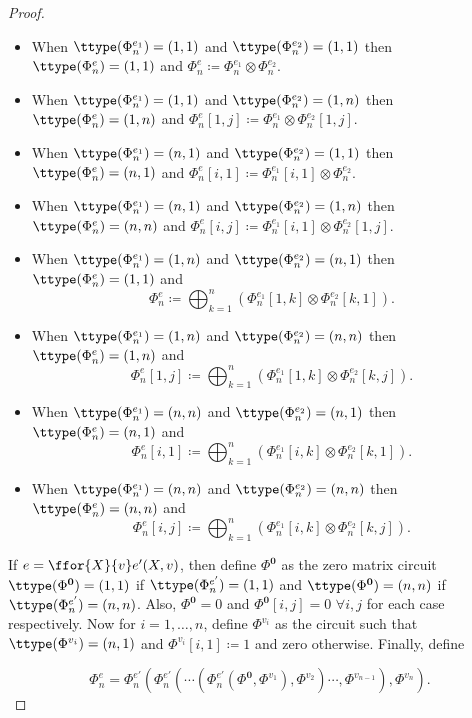 \begin{proof}
\begin{itemize}
	\item When $\ttype(\Phi^{e_1}_n)=(1,1)$ and $\ttype(\Phi^{e_2}_n)=(1, 1)$ then $\ttype(\Phi^{e}_n)=(1, 1)$ and $\Phi^{e}_n\coloneqq \Phi^{e_1}_n \otimes \Phi^{e_2}_n$.
  \item When $\ttype(\Phi^{e_1}_n)=(1,1)$ and $\ttype(\Phi^{e_2}_n)=(1, n)$ then $\ttype(\Phi^{e}_n)=(1, n)$ and $\Phi^{e}_n[1,j]\coloneqq \Phi^{e_1}_n \otimes \Phi^{e_2}_n[1,j]$.
  \item When $\ttype(\Phi^{e_1}_n)=(n,1)$ and $\ttype(\Phi^{e_2}_n)=(1, 1)$ then $\ttype(\Phi^{e}_n)=(n, 1)$ and $\Phi^{e}_n[i,1]\coloneqq \Phi^{e_1}_n[i,1] \otimes \Phi^{e_2}_n$.
  \item When $\ttype(\Phi^{e_1}_n)=(n,1)$ and $\ttype(\Phi^{e_2}_n)=(1, n)$ then $\ttype(\Phi^{e}_n)=(n, n)$ and $\Phi^{e}_n[i,j]\coloneqq \Phi^{e_1}_n[i,1] \otimes \Phi^{e_2}_n[1,j]$.
  \item When $\ttype(\Phi^{e_1}_n)=(1,n)$ and $\ttype(\Phi^{e_2}_n)=(n, 1)$ then $\ttype(\Phi^{e}_n)=(1, 1)$ and $$\Phi^{e}_n\coloneqq \bigoplus_{k=1}^n \left( \Phi^{e_1}_n[1,k] \otimes \Phi^{e_2}_n[k,1] \right).$$
  \item When $\ttype(\Phi^{e_1}_n)=(1,n)$ and $\ttype(\Phi^{e_2}_n)=(n, n)$ then $\ttype(\Phi^{e}_n)=(1, n)$ and $$\Phi^{e}_n[1,j]\coloneqq \bigoplus_{k=1}^n \left( \Phi^{e_1}_n[1,k] \otimes \Phi^{e_2}_n[k,j] \right).$$
  \item When $\ttype(\Phi^{e_1}_n)=(n,n)$ and $\ttype(\Phi^{e_2}_n)=(n, 1)$ then $\ttype(\Phi^{e}_n)=(n, 1)$ and $$\Phi^{e}_n[i,1]\coloneqq \bigoplus_{k=1}^n \left( \Phi^{e_1}_n[i,k] \otimes \Phi^{e_2}_n[k,1] \right).$$
  \item When $\ttype(\Phi^{e_1}_n)=(n,n)$ and $\ttype(\Phi^{e_2}_n)=(n, n)$ then $\ttype(\Phi^{e}_n)=(n, n)$ and $$\Phi^{e}_n[i,j]\coloneqq \bigoplus_{k=1}^n \left( \Phi^{e_1}_n[i,k] \otimes \Phi^{e_2}_n[k,j] \right).$$
\end{itemize}

If $e=\ffor{X}{v}e'(X, v)$, then define $\Phi^{\mathbf{0}}$ 
as the zero matrix circuit $\ttype(\Phi^{\mathbf{0}})=(1,1)$ if $\ttype(\Phi^{e'}_n)=(1,1)$ and 
$\ttype(\Phi^{\mathbf{0}})=(n,n)$ if $\ttype(\Phi^{e'}_n)=(n,n)$. Also, $\Phi^{\mathbf{0}}=0$ and
$\Phi^{\mathbf{0}}[i,j]=0$ $\forall i,j$ for each case respectively. Now for $i=1,\ldots, n$, define
$\Phi^{v_i}$ as the circuit such that $\ttype(\Phi^{v_i})=(n,1)$ and $\Phi^{v_i}[i,1]\coloneqq 1$ and zero otherwise.
Finally, define

$$\Phi^{e}_n=\Phi^{e'}_n\left( \Phi^{e'}_n \left( \cdots \left( \Phi^{e'}_n\left( \Phi^{\mathbf{0}}, \Phi^{v_1}\right), \Phi^{v_2}\right)\cdots, \Phi^{v_{n-1}} \right), \Phi^{v_n} \right).$$


\end{proof}
